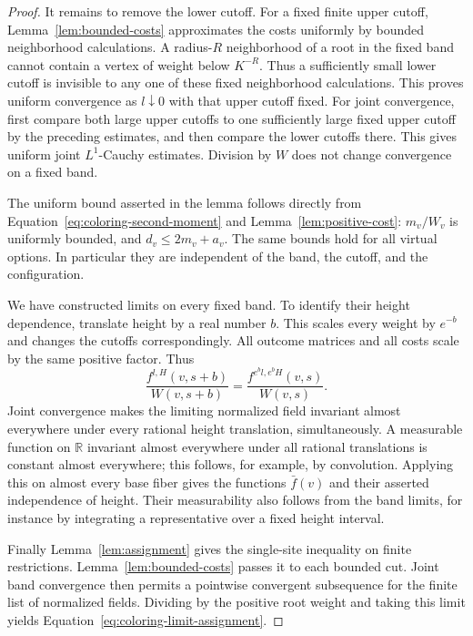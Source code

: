 \begin{proof}
It remains to remove the lower cutoff.  For a fixed finite upper cutoff,
Lemma~\ref{lem:bounded-costs} approximates the costs uniformly by bounded
neighborhood calculations.  A radius-$R$ neighborhood of a root in the
fixed band cannot contain a vertex of weight below $K^{-R}$.  Thus a
sufficiently small lower cutoff is invisible to any one of these fixed
neighborhood calculations.  This proves uniform convergence as
$l\downarrow0$ with that upper cutoff fixed.  For joint convergence, first
compare both large upper cutoffs to one sufficiently large fixed upper
cutoff by the preceding estimates, and then compare the lower cutoffs
there.  This gives uniform joint $L^1$-Cauchy estimates.  Division by $W$
does not change convergence on a fixed band.

The uniform bound asserted in the lemma follows directly from
Equation~\eqref{eq:coloring-second-moment} and
Lemma~\ref{lem:positive-cost}: $m_v/W_v$ is uniformly bounded, and
$d_v\leq2m_v+a_v$.  The same bounds hold for all virtual options.  In
particular they are independent of the band, the cutoff, and the
configuration.

We have constructed limits on every fixed band.  To identify their height
dependence, translate height by a real number $b$.  This scales every
weight by $e^{-b}$ and changes the cutoffs correspondingly.  All outcome
matrices and all costs scale by the same positive factor.  Thus
\[
 \frac{f^{l,H}(v,s+b)}{W(v,s+b)}
   =\frac{f^{e^b l,e^b H}(v,s)}{W(v,s)}.
\]
Joint convergence makes the limiting normalized field invariant almost
everywhere under every rational height translation, simultaneously.
A measurable function on $\mathbb R$ invariant almost everywhere under
all rational translations is constant almost everywhere; this follows,
for example, by convolution.  Applying this on almost every base fiber
gives the functions $\bar f(v)$ and their asserted independence of height.
Their measurability also follows from the band limits, for instance by
integrating a representative over a fixed height interval.

Finally Lemma~\ref{lem:assignment} gives the single-site inequality on
finite restrictions.  Lemma~\ref{lem:bounded-costs} passes it to each
bounded cut.  Joint band convergence then permits a pointwise convergent
subsequence for the finite list of normalized fields.  Dividing by the
positive root weight and taking this limit yields
Equation~\eqref{eq:coloring-limit-assignment}.
\end{proof}

